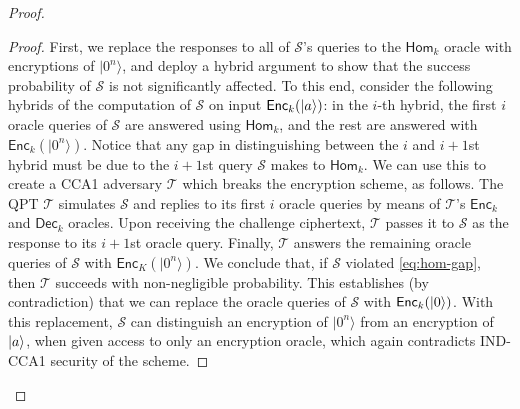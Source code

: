 \documentclass[envcountsame]{llncs}
\numberwithin{equation}{section}
\newcommand{\algo}{\mathcal}
\newcommand{\Enc}{\ensuremath{\mathsf{Enc}}\xspace}
\newcommand{\Dec}{\ensuremath{\mathsf{Dec}}\xspace}
\newcommand{\Homorcl}{\ensuremath{\mathsf{Hom}}\xspace}
\begin{document}
\begin{proof}
\begin{proof}
First, we replace the responses to all of $\algo{S}$'s queries to the $\Homorcl_k$ oracle with encryptions of $|0^n\rangle$, and deploy a hybrid argument to show that the success probability of $\algo S$ is not significantly affected. To this end, consider the following hybrids of the computation of $\algo S$ on input $\Enc_k(\ket{a})$: in the $i$-th hybrid, the first $i$ oracle queries of $\algo S$ are answered using $\Homorcl_k$, and the rest are answered with $\Enc_k(|0^n\rangle)$.  Notice that any gap in distinguishing between the $i$ and $i+1$st hybrid must be due to the $i+1$st query $\algo S$ makes to $\Homorcl_k$. We can use this to create a CCA1 adversary $\algo T$ which breaks the encryption scheme, as follows. The QPT $\algo T$ simulates $\algo S$ and replies to its first $i$ oracle queries by means of $\algo T$'s $\Enc_k$ and $\Dec_k$ oracles. Upon receiving the challenge ciphertext, $\algo T$ passes it to $\algo S$ as the response to its $i+1$st oracle query. Finally, $\algo T$ answers the remaining oracle queries of $\algo S$ with $\Enc_K(|0^n\rangle)$. We conclude that, if $\algo S$ violated \eqref{eq:hom-gap}, then $\algo T$ succeeds with non-negligible probability. This establishes (by contradiction) that we can replace the oracle queries of $\algo S$ with $\Enc_k(\ket 0)$. With this replacement, $\algo S$ can distinguish an encryption of $|0^n\rangle$ from an encryption of ${\left\vert{a}\right\rangle}$, when given access to only an encryption oracle, which again contradicts IND-CCA1 security of the scheme. 
\end{proof}


\end{proof}
\end{document}
